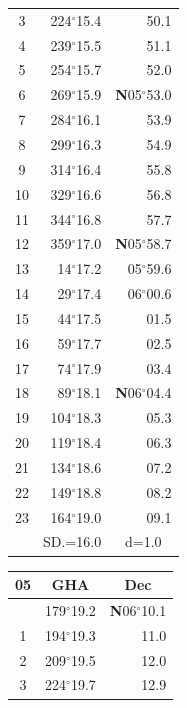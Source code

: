 \documentclass[10pt, a4paper]{report}
\begin{document}
\begin{scriptsize}
\begin{tabular*}{0.2\textwidth}[t]{@{\extracolsep{\fill}}|c|rr|}
3 & 224$^\circ$15.4 & \raisebox{0.24ex}{\boldmath$\cdot$~\boldmath$\cdot$~~}50.1\\
4 & 239$^\circ$15.5 & 51.1\\
5 & 254$^\circ$15.7 & 52.0\\[2Pt]
6 & 269$^\circ$15.9 & \textbf{N}05$^\circ$53.0\\
7 & 284$^\circ$16.1 & 53.9\\
8 & 299$^\circ$16.3 & 54.9\\
9 & 314$^\circ$16.4 & \raisebox{0.24ex}{\boldmath$\cdot$~\boldmath$\cdot$~~}55.8\\
10 & 329$^\circ$16.6 & 56.8\\
11 & 344$^\circ$16.8 & 57.7\\[2Pt]
12 & 359$^\circ$17.0 & \textbf{N}05$^\circ$58.7\\
13 & 14$^\circ$17.2 & 05$^\circ$59.6\\
14 & 29$^\circ$17.4 & 06$^\circ$00.6\\
15 & 44$^\circ$17.5 & \raisebox{0.24ex}{\boldmath$\cdot$~\boldmath$\cdot$~~}01.5\\
16 & 59$^\circ$17.7 & 02.5\\
17 & 74$^\circ$17.9 & 03.4\\[2Pt]
18 & 89$^\circ$18.1 & \textbf{N}06$^\circ$04.4\\
19 & 104$^\circ$18.3 & 05.3\\
20 & 119$^\circ$18.4 & 06.3\\
21 & 134$^\circ$18.6 & \raisebox{0.24ex}{\boldmath$\cdot$~\boldmath$\cdot$~~}07.2\\
22 & 149$^\circ$18.8 & 08.2\\
23 & 164$^\circ$19.0 & 09.1\\
\hline
\rule{0pt}{2.4ex} & \multicolumn{1}{c}{SD.=16.0} & \multicolumn{1}{c|}{d=1.0}\\
\hline
\end{tabular*}\noindent
\begin{tabular*}{0.2\textwidth}[t]{@{\extracolsep{\fill}}|c|rr|}
\hline
\multicolumn{1}{|c|}{\rule{0pt}{2.6ex}\textbf{05}} & \multicolumn{1}{c}{\textbf{GHA}} & \multicolumn{1}{c|}{\textbf{Dec}}\\
\hline\rule{0pt}{2.6ex}\noindent
0 & 179$^\circ$19.2 & \textbf{N}06$^\circ$10.1\\
1 & 194$^\circ$19.3 & 11.0\\
2 & 209$^\circ$19.5 & 12.0\\
3 & 224$^\circ$19.7 & \raisebox{0.24ex}{\boldmath$\cdot$~\boldmath$\cdot$~~}12.9\\

\end{tabular*}
\end{scriptsize}
\end{document}
